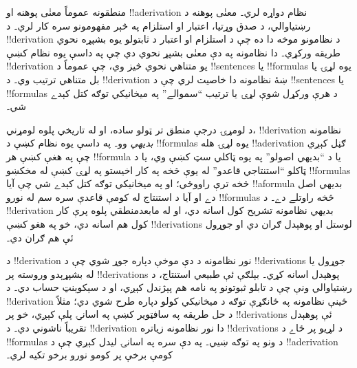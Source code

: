 \documentclass[../../../include/open-logic-section]{subfiles}
\begin{document}
      {}
      {}


منطقونه عموماً معنٰی پوهنه او !!a{derivation} نظام دواړه لري۔ معنٰی
پوهنه د رښتياوالي، د صدق وړتيا، اعتبار او استلزام په څېر مفهومونو
سره کار لري۔ د !!{derivation} د نظامونو موخه دا ده چې د استلزام او
اعتبار د ثابتولو يوه بشپړه نحوي طريقه ورکړي۔ دا نظامونه په دې معنٰی
بشپړ نحوي دي چې په داسې يوه نظام کښې !!{derivation} يو متناهي نحوي
څيز وي، چې عموماً د !!{sentence}s يا !!{formula}s يوه لړۍ يا بل
متناهي ترتيب وي۔ د !!{derivation} ښۀ نظامونه دا خاصيت لري چې د
!!{sentence}s يا !!{formula}s د هرې ورکړل شوې لړۍ يا ترتيب
``سموالے'' په ميخانيکي توګه کتل کېدے شي۔

د لومړۍ درجې منطق تر ټولو ساده، او له تاريخي پلوه لومړني،
!!{derivation} نظامونه \emph{بديهي} وو۔ په داسې يوه نظام کښې د
!!{formula}s يوه لړۍ هله !!a{derivation} ګڼل کېږي چې په هغې کښې هر
!!{formula} يا د ``بديهي اصولو'' په يوه ټاکلي سټ کښې وي، يا د ټاکلو
``استنتاجي قاعدو'' له يوې څخه په کار اخيستو په لړۍ کښې له مخکښو
!!{formula}s څخه ترې راووځي؛ او په ميخانيکي توګه کتل کېدے شي چې آيا
!!a{formula} بديهي اصل دے او آيا د استنتاج له کومې قاعدې سره سم له
نورو !!{formula}s څخه راوتلے دے۔ د !!{derivation} بديهي نظامونه
تشريح کول اسانه دي، او له مابعدمنطقي پلوه پرې کار کول هم اسانه دي،
خو په هغو کښې !!{derivation}s لوستل او پوهېدل ګران دي او جوړول ئې هم
ګران دي۔

د !!{derivation} نور نظامونه د دې موخې دپاره جوړ شوي چې د
!!{derivation}s جوړول يا له بشپړېدو وروسته پر !!{derivation}s
پوهېدل اسانه کړي۔
بېلګې ئې طبيعي استنتاج، د رښتياوالي ونې چې د تابلو ثبوتونو په نامه
هم پېژندل کېږي، او د سېکوېنټ حساب دي۔ د !!{derivation} ځينې نظامونه
په ځانګړې توګه د ميخانيکي کولو دپاره طرح شوي دي؛ مثلاً د حل طريقه
په سافټوير کښې په اسانۍ پلې کېږي، خو پر !!{derivation}s ئې پوهېدل
تقريباً ناشوني دي۔ د !!{derivation} دا نور نظامونه زياتره
!!{derivation}s د لړيو پر ځاے د !!{formula}s د ونو په توګه ښيي۔ په
دې سره په اسانۍ ليدل کېږي چې د !!a{derivation} کومې برخې پر کومو
نورو برخو تکيه لري۔
\end{document}
